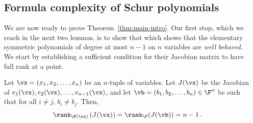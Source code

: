 \subsection{Formula complexity of Schur polynomials}
\label{sec:schur-formula-complexity}
%
%
%
%
%
%
%
%
%
%
%
%
%
%
We are now ready to prove Theorem~\ref{thm:main-intro}. Our first stop, which we reach in the next two lemmas, is to show that which shows that the elementary symmetric polynomials of degree at most $n-1$ on $n$ variables are \emph{well behaved}. We start by establishing a sufficient condition for their Jacobian matrix to have full rank at a point. 
\begin{lemma}\label{lem:jacobian of esyms}
Let $\vx = (x_1, x_2, \ldots, x_n)$ be an $n$-tuple of variables. Let $J(\vx)$ be the Jacobian of $e_1(\vx), e_2(\vx), \ldots, e_{n-1}(\vx)$, and let $\vb = (b_1, b_2, \ldots, b_n) \in \F^n$ be such that for all $i \neq j$, $b_i \neq b_j$. Then, 
\[
\rank_{\F(\vx)}\left(J(\vx) \right) = \rank_{\F}(J(\vb)) = n-1 \, .
\]
\end{lemma}

